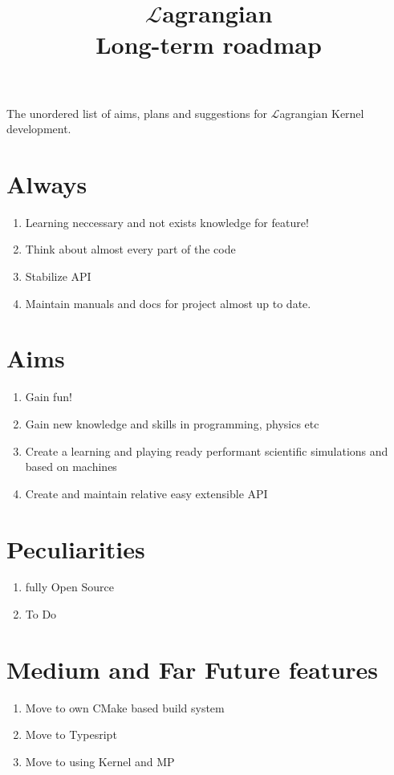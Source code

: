 \documentclass[12pt]{article}
\title{$\mathcal{L}$agrangian \\ Long-term roadmap}
\begin{document}
	\maketitle

	The unordered list of aims, plans and suggestions for $\mathcal{L}$agrangian Kernel development.

	\section{Always}
	\begin{enumerate}
		\item Learning neccessary and not exists knowledge for feature!
		\item Think about almost every part of the code
		\item Stabilize API
		\item Maintain manuals and docs for project almost up to date.
	\end{enumerate}

	\section{Aims}
	\begin{enumerate}
		\item Gain fun!
		\item Gain new knowledge and skills in programming, physics etc
		\item Create a learning and playing ready performant scientific simulations and based on machines
		\item Create and maintain relative easy extensible API
	\end{enumerate}

	\section{Peculiarities}


	\begin{enumerate}
	\item fully Open Source
	\item To Do
	\end{enumerate}

	\section{Medium and Far Future features}

	\begin{enumerate}
		\item Move to own CMake based build system
		\item Move to Typesript
		\item Move to using Kernel and MP
	\end{enumerate}
\end{document}
